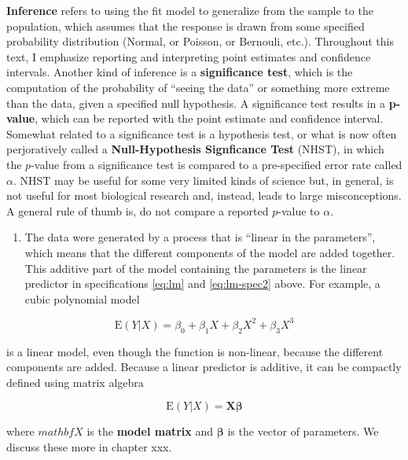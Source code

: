 \documentclass[]{book}
\providecommand{\tightlist}{%
  \setlength{\itemsep}{0pt}\setlength{\parskip}{0pt}}
\begin{document}
\textbf{Inference} refers to using the fit model to generalize from the
sample to the population, which assumes that the response is drawn from
some specified probability distribution (Normal, or Poisson, or
Bernouli, etc.). Throughout this text, I emphasize reporting and
interpreting point estimates and confidence intervals. Another kind of
inference is a \textbf{significance test}, which is the computation of
the probability of ``seeing the data'' or something more extreme than
the data, given a specified null hypothesis. A significance test results
in a \textbf{p-value}, which can be reported with the point estimate and
confidence interval. Somewhat related to a significance test is a
hypothesis test, or what is now often perjoratively called a
\textbf{Null-Hypothesis Signficance Test} (NHST), in which the
\(p\)-value from a significance test is compared to a pre-specified
error rate called \(\alpha\). NHST may be useful for some very limited
kinds of science but, in general, is not useful for most biological
research and, instead, leads to large misconceptions. A general rule of
thumb is, do not compare a reported \(p\)-value to \(\alpha\).

\begin{enumerate}
\def\labelenumi{\arabic{enumi}.}
\tightlist
\item
  The data were generated by a process that is ``linear in the
  parameters'', which means that the different components of the model
  are added together. This additive part of the model containing the
  parameters is the linear predictor in specifications \eqref{eq:lm} and
  \eqref{eq:lm-spec2} above. For example, a cubic polynomial model
\end{enumerate}

\begin{equation}
\mathrm{E}(Y|X) = \beta_0 + \beta_1 X + \beta_2 X^2 + \beta_3 X^3
\end{equation}

is a linear model, even though the function is non-linear, because the
different components are added. Because a linear predictor is additive,
it can be compactly defined using matrix algebra

\begin{equation}
\mathrm{E}(Y|X) = \mathbf{X}\boldsymbol{\beta}
\end{equation}

where \(mathbf{X}\) is the \textbf{model matrix} and
\(\boldsymbol{\beta}\) is the vector of parameters. We discuss these
more in chapter xxx.
\end{document}
